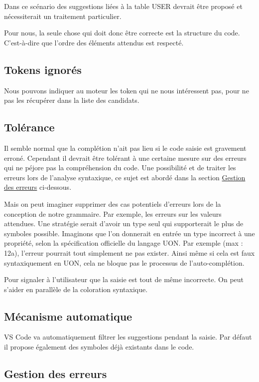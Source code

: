 \documentclass[
    iict, %
    il, %
]{heig-tb}
\begin{document}
Dans ce scénario des suggestions liées à la table USER devrait être proposé et nécessiterait un traitement particulier.

Pour nous, la seule chose qui doit donc être correcte est la structure du code. C'est-à-dire que l'ordre des éléments attendus est respecté.

\subsection{Tokens ignorés}
Nous pouvons indiquer au moteur les token qui ne nous intéressent pas, pour ne pas les récupérer dans la liste des candidats.

\subsection{Tolérance}
Il semble normal que la complétion n'ait pas lieu si le code saisie est gravement erroné.
Cependant il devrait être tolérant à une certaine mesure sur des erreurs qui ne péjore pas la compréhension du code.
Une possibilité et de traiter les erreurs lors de l'analyse syntaxique, ce sujet est abordé dans la section \hyperref[error handle]{Gestion des erreurs} ci-dessous.

Mais on peut imaginer supprimer des cas potentiels d'erreurs lors de la conception de notre grammaire.
Par exemple, les erreurs sur les valeurs attendues. Une stratégie serait d'avoir un type seul qui supporterait le plus de symboles possible.
Imaginons que l'on donnerait en entrée un type incorrect à une propriété, selon la spécification officielle du langage UON.
Par exemple (max : 12a), l'erreur pourrait tout simplement ne pas exister.
Ainsi même si cela est faux syntaxiquement en UON, cela ne bloque pas le processus de l'auto-complétion.

Pour signaler à l'utilisateur que la saisie est tout de même incorrecte. On peut s'aider en parallèle de la coloration syntaxique.

\subsection{Mécanisme automatique}
VS Code va automatiquement filtrer les suggestions pendant la saisie.
Par défaut il propose également des symboles déjà existants dans le code.

\subsection{Gestion des erreurs }\label{error handle}
\end{document}
